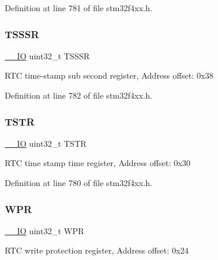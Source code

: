 Definition at line 781 of file stm32f4xx.\+h.

\mbox{\label{struct_r_t_c___type_def_a1d6c2bc4c067d6a64ef30d16a5925796}} 
\subsubsection{\texorpdfstring{T\+S\+S\+SR}{TSSSR}}
{\footnotesize\ttfamily \hyperlink{group___c_m_s_i_s__core__definitions_gaec43007d9998a0a0e01faede4133d6be}{\+\_\+\+\_\+\+IO} uint32\+\_\+t T\+S\+S\+SR}

R\+TC time-\/stamp sub second register, Address offset\+: 0x38 

Definition at line 782 of file stm32f4xx.\+h.

\mbox{\label{struct_r_t_c___type_def_a042059c8b4168681d6aecf30211dd7b8}} 
\subsubsection{\texorpdfstring{T\+S\+TR}{TSTR}}
{\footnotesize\ttfamily \hyperlink{group___c_m_s_i_s__core__definitions_gaec43007d9998a0a0e01faede4133d6be}{\+\_\+\+\_\+\+IO} uint32\+\_\+t T\+S\+TR}

R\+TC time stamp time register, Address offset\+: 0x30 

Definition at line 780 of file stm32f4xx.\+h.

\mbox{\label{struct_r_t_c___type_def_a6204786b050eb135fabb15784698e86e}} 
\subsubsection{\texorpdfstring{W\+PR}{WPR}}
{\footnotesize\ttfamily \hyperlink{group___c_m_s_i_s__core__definitions_gaec43007d9998a0a0e01faede4133d6be}{\+\_\+\+\_\+\+IO} uint32\+\_\+t W\+PR}

R\+TC write protection register, Address offset\+: 0x24 

